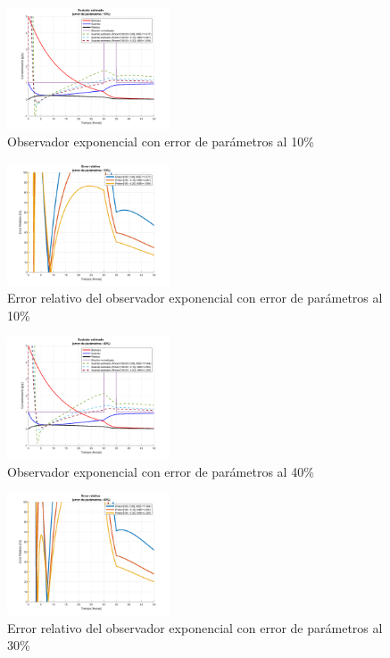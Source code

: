 \documentclass[letterpaper, 10 pt, conference]{ieeeconf}  %
\begin{document}
\begin{figure}[H]
  \centering
  \includegraphics[width=0.43\textwidth]{./Images_tp2/exponencial_3.png}
  \caption{Observador exponencial con error de parámetros al 10\%}
\end{figure}

\begin{figure}[H]
  \centering
  \includegraphics[width=0.43\textwidth]{./Images_tp2/exponencial_3_error.png}
  \caption{Error relativo del observador exponencial con error de parámetros al 10\%}
\end{figure}

\begin{figure}[H]
  \centering
  \includegraphics[width=0.43\textwidth]{./Images_tp2/exponencial_4.png}
  \caption{Observador exponencial con error de parámetros al 40\%}
\end{figure}

\begin{figure}[H]
  \centering
  \includegraphics[width=0.43\textwidth]{./Images_tp2/exponencial_4_error.png}
  \caption{Error relativo del observador exponencial con error de parámetros al 30\%}
\end{figure}
\end{document}
